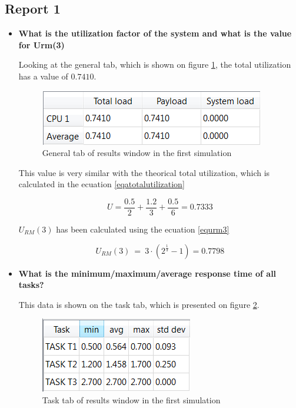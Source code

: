 \documentclass[12pt]{article}
\begin{document}
\subsection{Report 1}

\begin{itemize}
\item \textbf{What is the utilization factor of the system and what is the value for Urm(3)}

Looking at the general tab, which is shown on figure \ref{ageneraltab}, the total utilization has a value of $0.7410$.

\begin{figure}[h]
\centering
\includegraphics[scale=1]{figures/A_total_utilization}   
\caption{General tab of results window in the first simulation}
\label{ageneraltab}
\end{figure}
\FloatBarrier

This value is very similar with the theorical total utilization, which is calculated in the ecuation \ref{eqatotalutilization}

\begin{equation}\label{eqatotalutilization}
U= \frac{0.5}{2} + \frac{1.2}{3} + \frac{0.5}{6} = 0.7333 
\end{equation}

$U_{RM}(3)$ has been calculated using the ecuation \ref{equrm3}

\begin{equation}\label{equrm3}
U_{RM}(3)\ =\ 3·(2^{\frac{1}{3}}-1)=0.7798 
\end{equation}

\item \textbf{What is the minimum/maximum/average response time of all tasks?}

This data is shown on the task tab, which is presented on figure \ref{atasktab}.

\begin{figure}[h]
\centering
\includegraphics[scale=1]{figures/A_tasks}   
\caption{Task tab of results window in the first simulation}
\label{atasktab}
\end{figure}
\FloatBarrier


\end{itemize}
\end{document}
